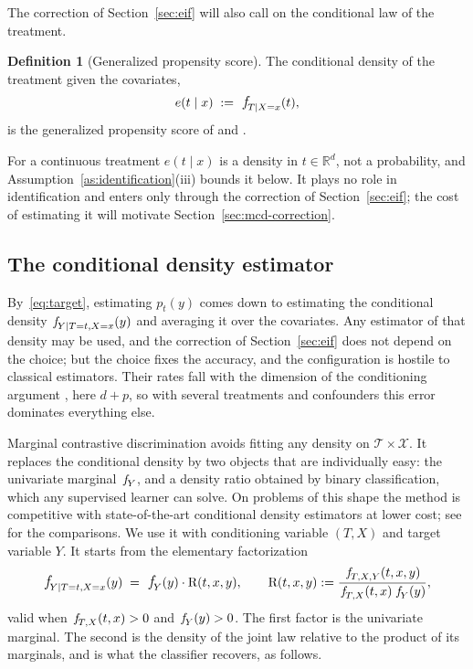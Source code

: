 \documentclass[11pt]{article}
\theoremstyle{plain}
\theoremstyle{definition}
\newtheorem{mydef}{Definition}
\theoremstyle{remark}
\newcommand{\R}{\mathbb{R}}
\newcommand{\cX}{\ensuremath{\mathcal{X}}}
\newcommand{\cT}{\ensuremath{\mathcal{T}}}
\newcommand{\pf}[1]{\ensuremath{\,\mathlarger{\textit{f}}_{#1}}}
\newcommand{\DensityRatio}{\text{R}}
\newcommand{\gps}{e}
\begin{document}
The correction of Section~\ref{sec:eif} will also call on the conditional law of the
treatment.

\begin{mydef}[Generalized propensity score]
\label{def:gps}
The conditional density of the treatment given the covariates,
\begin{equation}
\gps(t \mid x) \;:=\; \pf{T \mid X=x}(t),
\label{eq:gps}
\end{equation}
is the generalized propensity score of \citet{imbens2000} and \citet{hirano2004}.
\end{mydef}

For a continuous treatment $\gps(t\mid x)$ is a density in $t \in \R^{d}$, not a
probability, and Assumption~\ref{as:identification}(iii) bounds it below. It plays no role
in identification and enters only through the correction of Section~\ref{sec:eif}; the cost
of estimating it will motivate Section~\ref{sec:mcd-correction}.

\subsection{The conditional density estimator}
\label{sec:setting-mcd}

By~\eqref{eq:target}, estimating $p_t(y)$ comes down to estimating the conditional density
$\pf{Y \mid T=t,X=x}(y)$ and averaging it over the covariates. Any estimator of that
density may be used, and the correction of Section~\ref{sec:eif} does not depend on the
choice; but the choice fixes the accuracy, and the configuration is hostile to classical
estimators. Their rates fall with the dimension of the conditioning argument
\citep{stone1980,Tsybakov2009NonparametricEstimation,bashtannyk2001,hall2004}, here $d+p$,
so with several treatments and confounders this error dominates everything else.

Marginal contrastive discrimination avoids fitting any density on $\cT \times \cX$. It
replaces the conditional density by two objects that are individually easy: the univariate
marginal $\pf{Y}$, and a density ratio obtained by binary classification, which any
supervised learner can solve. On problems of this shape the method is competitive with
state-of-the-art conditional density estimators at lower cost; see \citet{meziani2025mcd}
for the comparisons. We use it with conditioning variable $(T,X)$ and target variable $Y$.
It starts from the elementary factorization
\begin{equation}
\pf{Y \mid T=t,X=x}(y)
\;=\; \pf{Y}(y) \cdot \DensityRatio(t,x,y),
\qquad
\DensityRatio(t,x,y) := \frac{\pf{T,X,Y}(t,x,y)}{\pf{T,X}(t,x)\,\pf{Y}(y)} ,
\label{eq:reformulation}
\end{equation}
valid when $\pf{T,X}(t,x) > 0$ and $\pf{Y}(y) > 0$. The first factor is the univariate
marginal. The second is the density of the joint law relative to the product of its
marginals, and is what the classifier recovers, as follows.
\end{document}
